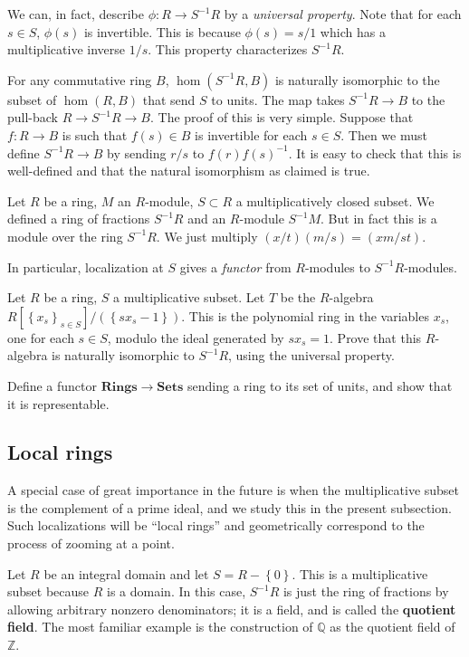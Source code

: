 We can, in fact, describe $\phi: R \to S^{-1}R$ by a \emph{universal
property}. Note
that for each $s \in S$, $\phi(s)$ is invertible.  This is because $\phi(s) =
s/1$ which has a multiplicative inverse $1/s$.  This property characterizes
$S^{-1}R$.

For any commutative ring $B$, $\hom(S^{-1}R, B)$ is naturally isomorphic to the
subset of $\hom(R,B)$ that send $S$ to units.  The map takes $S^{-1}R \to B$ to
the pull-back $R \to S^{-1}R \to B$.  The proof of this is very simple.
Suppose that $f: R \to B$ is such that $f(s) \in B$ is invertible for each $s
\in S$.  Then we must define $S^{-1}R \to B$ by sending $r/s$ to
$f(r)f(s)^{-1}$.  It is easy to check that this is well-defined and that the
natural isomorphism as claimed is true.

Let $R$ be a ring, $M$ an $R$-module, $S \subset R$ a multiplicatively closed
subset. We defined a ring of fractions $S^{-1}R$ and an $R$-module $S^{-1}M$.
But in fact this is a module over the ring $S^{-1}R$.
We just multiply $(x/t)(m/s) = (xm/st)$.

In particular, localization at $S$ gives a \emph{functor} from $R$-modules to
$S^{-1}R$-modules.

\begin{exercise}
Let $R$ be a ring, $S$ a multiplicative subset. Let $T$ be the $R$-algebra
$R[\left\{x_s\right\}_{s \in S}]/( \left\{sx_s - 1\right\})$. This is the
polynomial ring in the variables $x_s$, one for each $s \in S$, modulo the
ideal generated by $sx_s  = 1$. Prove that this $R$-algebra is naturally
isomorphic to $S^{-1}R$, using the universal property.
\end{exercise}

\begin{exercise} Define a functor $\mathbf{Rings} \to \mathbf{Sets}$ sending
a ring to
its set of units, and show that it is representable.
\end{exercise}
\subsection{Local rings}

A special case of great importance in the future is when the multiplicative
subset is the complement of a prime ideal, and we study this in the present
subsection. Such localizations will be ``local rings'' and geometrically
correspond to the process of zooming at a point.

\begin{example}
Let $R$ be an integral domain and let $S = R - \left\{0\right\}$. This is a
multiplicative subset because $R$ is a domain.  In this case, $S^{-1}R$ is just
the ring of fractions by allowing arbitrary nonzero denominators; it is a
field, and is called the \textbf{quotient field}. The most familiar example is
the construction of $\mathbb{Q}$ as the quotient field of $\mathbb{Z}$.
\end{example}


